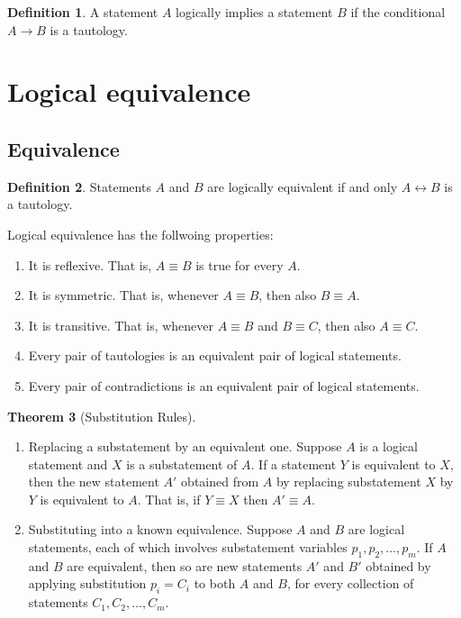 \documentclass[letterpaper, 10pt]{article}
\theoremstyle{definition}
\newtheorem{thm}{Theorem}[section]
\newtheorem{define}[thm]{Definition}
\renewcommand{\implies}{\rightarrow}
\newcommand{\bicond}{\leftrightarrow}
\begin{document}
\begin{define}
	A statement $A$ logically implies a statement $B$ if the conditional $A
	\implies B$ is a tautology.
\end{define}

\section{Logical equivalence}

\subsection{Equivalence}

\begin{define}
	Statements $A$ and $B$ are logically equivalent if and only $A \bicond B$ is a
	tautology. 
\end{define}

Logical equivalence has the follwoing properties:
\begin{enumerate}
	\item It is reflexive. That is, $A \equiv B$ is true for every $A$.
	\item It is symmetric. That is, whenever $A \equiv B$, then also $B \equiv
		A$.
	\item It is transitive. That is, whenever $A \equiv B$ and $B \equiv C$,
		then also $A \equiv C$.
	\item Every pair of tautologies is an equivalent pair of logical statements.
	\item Every pair of contradictions is an equivalent pair of logical
		statements.
\end{enumerate}

\begin{thm}[Substitution Rules]
	\begin{enumerate}
		\item Replacing a substatement by an equivalent one. Suppose $A$ is a
			logical statement and $X$ is a substatement of $A$. If a statement
			$Y$ is equivalent to $X$, then the new statement $A'$ obtained from
			$A$ by replacing substatement $X$ by $Y$ is equivalent to $A$. That
			is, if $Y \equiv X$ then $A'\equiv A$.
		\item Substituting into a known equivalence. Suppose $A$ and $B$ are
			logical statements, each of which involves substatement variables
			$p_1,p_2,\ldots,p_m$. If $A$ and $B$ are equivalent, then so are new
			statements $A'$ and $B'$ obtained by applying substitution $p_i=C_i$
			to both $A$ and $B$, for every collection of statements
			$C_1,C_2,\ldots,C_m$.
	\end{enumerate}
\end{thm}
\end{document}
